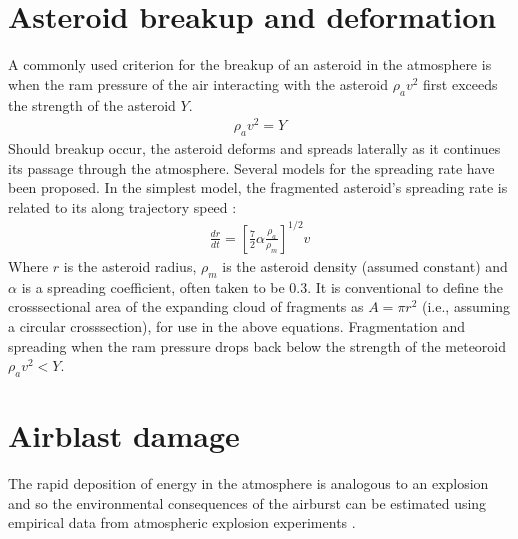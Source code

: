 \documentclass[letterpaper,10pt,english]{sphinxmanual}
\begin{document}
\section{Asteroid break\sphinxhyphen{}up and deformation}
\label{\detokenize{index:asteroid-break-up-and-deformation}}
\sphinxAtStartPar
A commonly used criterion for the break\sphinxhyphen{}up of an asteroid in the
atmosphere is when the ram pressure of the air interacting with the
asteroid \(\rho_a v^2\) first exceeds the strength of the asteroid
\(Y\).
\begin{equation*}
\begin{split}\rho_a v^2 = Y\end{split}
\end{equation*}
\sphinxAtStartPar
Should break\sphinxhyphen{}up occur, the asteroid deforms and spreads laterally as it
continues its passage through the atmosphere. Several models for the
spreading rate have been proposed. In the simplest model, the fragmented
asteroid’s spreading rate is related to its along trajectory speed
:
\begin{equation*}
\begin{split}\frac{dr}{dt} = \left[\frac{7}{2}\alpha\frac{\rho_a}{\rho_m}\right]^{1/2} v\end{split}
\end{equation*}
\sphinxAtStartPar
Where \(r\) is the asteroid radius, \(\rho_m\) is the asteroid
density (assumed constant) and \(\alpha\) is a spreading
coefficient, often taken to be 0.3. It is conventional to define the
cross\sphinxhyphen{}sectional area of the expanding cloud of fragments as
\(A = \pi r^2\) (i.e., assuming a circular cross\sphinxhyphen{}section), for use
in the above equations. Fragmentation and spreading  when the
ram pressure drops back below the strength of the meteoroid
\(\rho_a v^2 < Y\).


\section{Airblast damage}
\label{\detokenize{index:airblast-damage}}
\sphinxAtStartPar
The rapid deposition of energy in the atmosphere is analogous to an
explosion and so the environmental consequences of the airburst can be
estimated using empirical data from atmospheric explosion experiments
.
\end{document}
